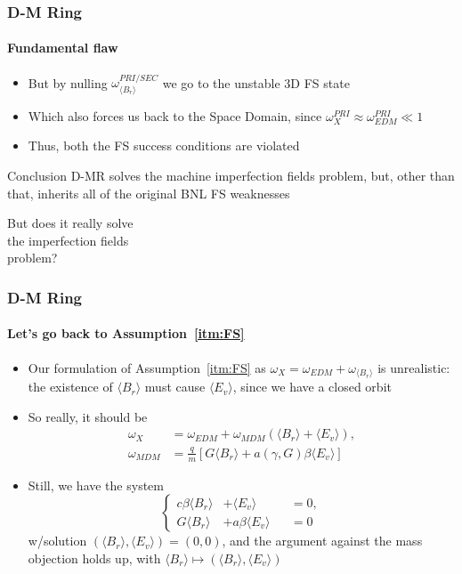 \documentclass{beamer}
\newcommand{\w}{\omega}
\newcommand{\avg}[1]{\langle{#1}\rangle}
\begin{document}
\begin{frame}\frametitle{D-M Ring}\framesubtitle{Fundamental flaw}
  \begin{itemize}
  \item But by nulling $\w_{\avg{B_r}}^{PRI/SEC}$ we go to the unstable 3D FS state
  \item Which also forces us back to the Space Domain, since $\w_X^{PRI} \approx \w_{EDM}^{PRI} \ll 1$
  \item Thus, both the FS success conditions are violated
  \end{itemize}
  \begin{block}{Conclusion}
    D-MR solves the machine imperfection fields problem, but, other than that,
    inherits all of the original BNL FS weaknesses
  \end{block}
  \begin{flushright}
    \begin{tcolorbox}[hbox]
      \begin{minipage}[b]{.4\linewidth}
        But does it really solve \\the imperfection fields \\problem?
      \end{minipage}
    \end{tcolorbox}
  \end{flushright}
\end{frame}
\begin{frame}\frametitle{D-M Ring}\framesubtitle{Let's go back to
    Assumption~\ref{itm:FS}}
  \begin{itemize}
  \item Our formulation of Assumption~\ref{itm:FS} as 
    $\w_X =  \w_{EDM} + \w_{\avg{B_r}}$ is unrealistic: the existence of
    $\avg{B_r}$ must cause $\avg{E_v}$, since we have a closed orbit
  \item So really, it should be 
    \begin{align*}
      \w_X &= \w_{EDM} + \w_{MDM}(\avg{B_r} + \avg{E_v}),\\
      \w_{MDM} &= \frac qm\left[G\avg{B_r} + a(\gamma,G)\beta\avg{E_v}\right]
    \end{align*}
  \item Still, we have the system
    \begin{equation*} \left\{
      \begin{alignedat}{2}
        c\beta\avg{B_r}  &+ \avg{E_v} &&= 0, \\
        G\avg{B_r} &+ a\beta\avg{E_v} &&= 0 
      \end{alignedat} \right.
    \end{equation*}
    w/solution $(\avg{B_r}, \avg{E_v}) = (0,0)$, and the argument against
    the mass objection holds up, with $\avg{B_r} \mapsto (\avg{B_r}, \avg{E_v})$
  \end{itemize}
\end{frame}
\end{document}
